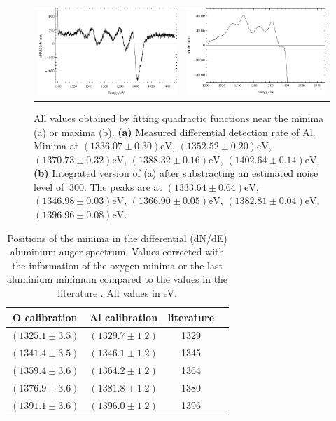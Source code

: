 \documentclass[a4paper]{scrartcl}
\numberwithin{equation}{section}
\numberwithin{figure}{section}
\numberwithin{table}{section}
\begin{document}
\label{sec:kll}
\begin{figure}[!h]
        \begin{center}
		  \begin{tabular}{l r}
        		\includegraphics[width=0.48\linewidth]{pic/auger.pdf}
			&
				\includegraphics[width=0.48\linewidth]{pic/augerSum.pdf}
        \end{tabular}
        \end{center}
        \caption{
			\small All values obtained by fitting quadractic functions near the minima (a) or maxima (b).
			\textbf{(a)} Measured differential detection rate of Al. Minima at $(1336.07\pm 0.30)\text{eV}$, $(1352.52\pm 0.20)\text{eV}$, $(1370.73\pm 0.32)\text{eV}$, $(1388.32\pm 0.16)\text{eV}$, $(1402.64\pm 0.14)\text{eV}$.
			\textbf{(b)} Integrated version of (a) after substracting an estimated noise level of $~300$. The peaks are at $(1333.64\pm 0.64)\text{eV}$, $(1346.98\pm 0.03)\text{eV}$, $(1366.90\pm 0.05)\text{eV}$, $(1382.81\pm 0.04)\text{eV}$, $(1396.96\pm 0.08)\text{eV}$.
        }
        \label{fig:auger}
\end{figure} 
\FloatBarrier
\begin{table}[!h]
\centering
\begin{tabular}{cccc}
\toprule
O calibration & Al calibration & literature \\
\midrule
$(1325.1\pm 3.5)$ & $(1329.7\pm 1.2)$ & 1329 \\
$(1341.4\pm 3.5)$ & $(1346.1\pm 1.2)$ & 1345 \\
$(1359.4\pm 3.6)$ & $(1364.2\pm 1.2)$ & 1364 \\
$(1376.9\pm 3.6)$ & $(1381.8\pm 1.2)$ & 1380 \\
$(1391.1\pm 3.6)$ & $(1396.0\pm 1.2)$ & 1396 \\
 \bottomrule
\end{tabular}
\caption{\small Positions of the minima in the differential (dN/dE) aluminium auger spectrum. Values corrected with the information of the oxygen minima or the last aluminium minimum compared to the values in the literature \cite{handbook}. All values in eV. }
\label{tab:OAlL}
\end{table}
\end{document}
